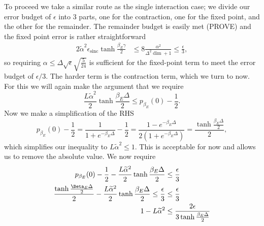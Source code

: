 \documentclass{article}
\DeclareMathOperator{\sinc}{sinc}
\begin{document}
To proceed we take a similar route as the single interaction case; we divide our error budget of $\epsilon$ into 3 parts, one for the contraction, one for the fixed point, and the other for the remainder. The remainder budget is easily met (PROVE) and the fixed point error is rather straightforward
\begin{align}
    2\widetilde{\alpha}^2 \epsilon_{\sinc} \tanh \frac{\beta_E \gamma}{2} &\le 8 \frac{\alpha^2}{\Delta^2 \dim + 1} \le \frac{\epsilon}{3},
\end{align}
so requiring $\alpha \le \Delta \sqrt{\epsilon} \sqrt{\frac{5}{24}}$ is sufficient for the fixed-point term to meet the error budget of $\epsilon / 3$.
The harder term is the contraction term, which we turn to now. For this we will again make the argument that we require
\begin{equation}
    \frac{L \widetilde{\alpha}^2}{2} \tanh \frac{\beta_E \Delta}{2} \le p_{\beta_E}(0) - \frac{1}{2}.
\end{equation}
Now we make a simplification of the RHS
\begin{equation}
    p_{\beta_E}(0) - \frac{1}{2} = \frac{1}{1 + e^{-\beta_E \Delta}} - \frac{1}{2} = \frac{1 - e^{-\beta_E \Delta}}{2(1 + e^{-\beta_E \Delta})} = \frac{\tanh \frac{\beta_E \Delta}{2}}{2},
\end{equation}
which simplifies our inequality to $L \widetilde{\alpha }^2 \le 1$. This is acceptable for now and allows us to remove the absolute value.
We now require
\begin{align}
    p_{\beta_E}(0) - \frac{1}{2} - \frac{L \widetilde{\alpha}^2}{2} \tanh{\frac{\beta_E \Delta}{2}} &\le \frac{\epsilon}{3} \\
    \frac{\tanh \frac{\Beta_E \Delta}{2}}{2} - \frac{L \widetilde{\alpha}^2}{2} \tanh{\frac{\beta_E \Delta}{2}} \le \frac{\epsilon}{3} &\le \frac{\epsilon}{3} \\
    1 - L \widetilde{\alpha}^2 &\le \frac{2 \epsilon}{3 \tanh \frac{\beta_E \Delta}{2}}
\end{align}
\end{document}
